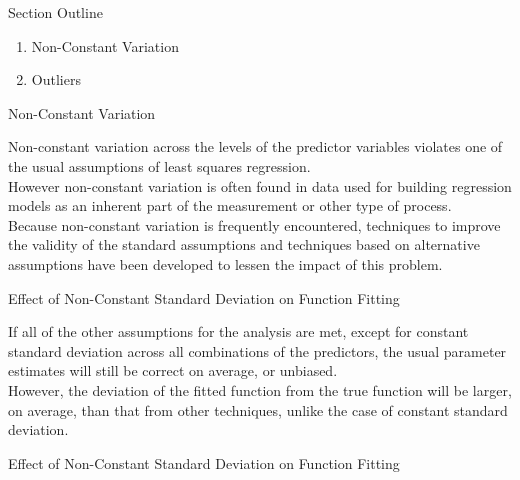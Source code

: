 \topmargin-0.5in
\textwidth6.5in
\pagestyle{myheadings}



\newbox\rbox
{\raggedright
{\huge  
\setcounter{page}{101}
\begin{center}
Section Outline
\end{center}
\vspace{0.5in}
\begin{enumerate}
\item Non-Constant Variation
\item Outliers
\end{enumerate}
\newpage
{}
\begin{center}
Non-Constant Variation
\end{center}
\vspace{0.75in}
Non-constant variation across the levels of the predictor
variables violates one of the usual assumptions of least
squares regression. \\
\vspace{0.5in}
However non-constant variation is often found in data
used for building regression models as an inherent part
of the measurement or other type of process. \\
\vspace{0.5in}
Because non-constant variation is frequently encountered, techniques 
to improve the validity of the standard assumptions and techniques 
based on alternative assumptions have been developed to lessen
the impact of this problem. 
\newpage
\begin{center}
Effect of Non-Constant Standard Deviation on Function Fitting
\end{center}
\vspace{0.75in}
If all of the other assumptions for the analysis are met,
except for constant standard deviation across all combinations
of the predictors, the usual parameter estimates will still
be correct on average, or unbiased. \\
\vspace{0.5in}
However, the deviation of the fitted function from the true function
will be larger, on average, than that from other techniques, unlike 
the case of constant standard deviation.
\newpage
\begin{center}
Effect of Non-Constant Standard Deviation on Function Fitting
\end{center}
}}
